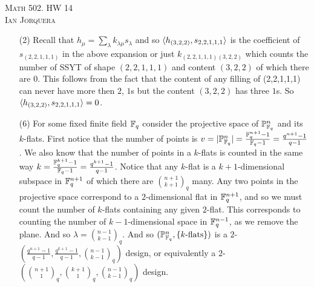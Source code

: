 \documentclass[12pt]{amsart}
\newcommand{\PPt}{\mathbb{P}}
\let\P\PPt
\begin{document}
\begin{center}
    \textsc{Math 502. HW 14\\ Ian Jorquera}
\end{center}
\vspace{1em}

\begin{itemize}

\item[(2)] Recall that $h_\mu= \sum_{\lambda}k_{\lambda\mu}s_\lambda$ and so $\langle h_{(3,2,2)},s_{2,2,1,1,1}\rangle$ is the coefficient of $s_{(2,2,1,1,1)}$ in the above expansion or just $k_{(2,2,1,1,1)(3,2,2)}$ which counts the number of SSYT of shape $(2,2,1,1,1)$ and content $(3,2,2)$ of which there are $0$. This follows from the fact that the content of any filling of (2,2,1,1,1) can never have more then $2$, $1$s but the content $(3,2,2)$ has three $1$s. So $\langle h_{(3,2,2)},s_{2,2,1,1,1}\rangle=0$.\\


\item[(6)] For some fixed finite field $\mathbb{F}_q$ consider the projective space of $\P^n_{\F_q}$ and its $k$-flats. First notice that the number of points is $v=|\P^n_{\F_q}|=\frac{\F_q^{n+1}-1}{\F_q-1}=\frac{q^{n+1}-1}{q-1}$.
We also know that the number of points in a $k$-flats is counted in the same way $k=\frac{\mathbb{F}_q^{k+1}-1}{\mathbb{F}_q-1}=\frac{q^{k+1}-1}{q-1}$. Notice that any $k$-flat is a $k+1$-dimensional subspace in $\mathbb{F}_q^{n+1}$ of which there are ${n+1\choose k+1}_q$ many. Any two points in the projective space correspond to a $2$-dimensional flat in $\mathbb{F}_q^{n+1}$, and so we must count the number of $k$-flats containing any given $2$-flat. This corresponds to counting the number of $k-1$-dimensional space in $\mathbb{F}_q^{n-1}$, as we remove the plane. And so $\lambda={n-1\choose k-1}_{q}$. And so $(\P_{\F_q}^{n}, \{k\text{-flats}\})$ is a $2$-$(\frac{q^{n+1}-1}{q-1},\frac{q^{k+1}-1}{q-1},{n-1\choose k-1}_{q})$ design, or equivalently a $2$-$({n+1\choose 1}_q,{k+1\choose 1}_q,{n-1\choose k-1}_{q})$ design.\\


\end{itemize}
\end{document}
